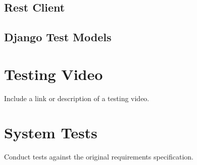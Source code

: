 \subsection{Rest Client}
\subsection{Django Test Models}

\section{Testing Video}
Include a link or description of a testing video.

\section{System Tests}
Conduct tests against the original requirements specification.



